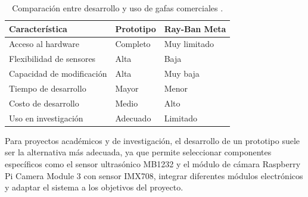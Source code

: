 \begin{table}[H]
\centering
\begin{tabular}{lll}
\hline
Característica & Prototipo & Ray-Ban Meta \\
\hline
Acceso al hardware & Completo & Muy limitado \\
Flexibilidad de sensores & Alta & Baja \\
Capacidad de modificación & Alta & Muy baja \\
Tiempo de desarrollo & Mayor & Menor \\
Costo de desarrollo & Medio & Alto \\
Uso en investigación & Adecuado & Limitado \\
\hline
\end{tabular}
\caption{Comparación entre desarrollo y uso de gafas comerciales \cite{raybanmeta_official}.}
\label{tabla_plataformas}
\end{table}

Para proyectos académicos y de investigación, el desarrollo de un prototipo suele ser la alternativa más adecuada, ya que permite seleccionar componentes específicos como el sensor ultrasónico MB1232 y el módulo de cámara Raspberry Pi Camera Module 3 con sensor IMX708, integrar diferentes módulos electrónicos y adaptar el sistema a los objetivos del proyecto.

